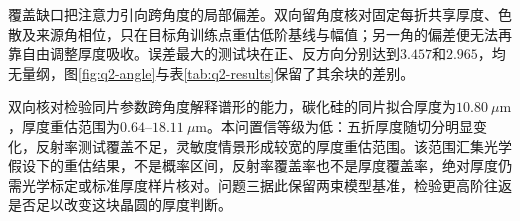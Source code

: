 覆盖缺口把注意力引向跨角度的局部偏差。双向留角度核对固定每折共享厚度、色散及来源角相位，只在目标角训练点重估低阶基线与幅值；另一角的偏差便无法再靠自由调整厚度吸收。误差最大的测试块在正、反方向分别达到$3.457$和$2.965$，均无量纲，图\ref{fig:q2-angle}与表\ref{tab:q2-results}保留了其余块的差别。



双向核对检验同片参数跨角度解释谱形的能力，碳化硅的同片拟合厚度为$10.80\ \mu\mathrm{m}$，厚度重估范围为$0.64$--$18.11\ \mu\mathrm{m}$。本问置信等级为低：五折厚度随切分明显变化，反射率测试覆盖不足，灵敏度情景形成较宽的厚度重估范围。该范围汇集光学假设下的重估结果，不是概率区间，反射率覆盖率也不是厚度覆盖率，绝对厚度仍需光学标定或标准厚度样片核对。问题三据此保留两束模型基准，检验更高阶往返是否足以改变这块晶圆的厚度判断。
